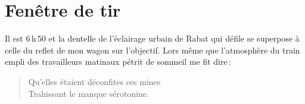 \section*{Fenêtre de tir}
\begin{prose}
  {I}{l est 6\,h\,50 et la dentelle de l’éclairage urbain de Rabat} qui défile se superpose à celle du reflet de mon wagon sur l’objectif. Lors même que l’atmosphère du train empli des travailleurs matinaux pétrit de sommeil me fit dire\,:
\end{prose}

\begin{verse}%
  \distique
  Qu’elles étaient déconfites ces mines\\ 
  Trahissant le manque sérotonine.
\end{verse}


